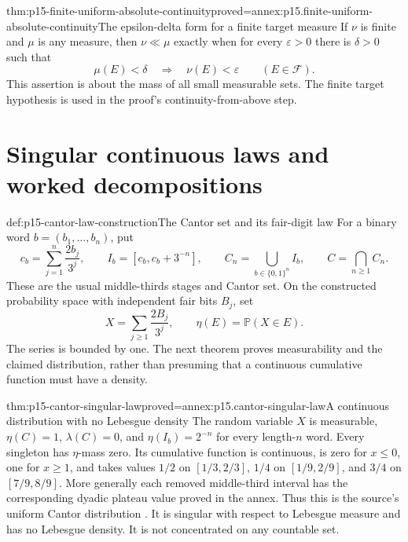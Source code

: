 \begin{hbtheorem}{thm:p15-finite-uniform-absolute-continuity}{proved=annex:p15.finite-uniform-absolute-continuity}{The epsilon-delta form for a finite target measure}
If \(\nu\) is finite and \(\mu\) is any measure, then \(\nu\ll\mu\)
exactly when for every \(\varepsilon>0\) there is \(\delta>0\) such that
\[
                    \mu(E)<\delta\quad\Longrightarrow\quad
                    \nu(E)<\varepsilon\qquad(E\in\mathcal F).
\]
This assertion is about the mass of all small measurable sets. The finite
target hypothesis is used in the proof's continuity-from-above step.
\end{hbtheorem}

\section{Singular continuous laws and worked decompositions}
\label{sec:p15-density-examples}

\begin{hbdefinition}{def:p15-cantor-law-construction}{The Cantor set and its fair-digit law}
For a binary word \(b=(b_1,\ldots,b_n)\), put
\[
 c_b=\sum_{j=1}^n\frac{2b_j}{3^j},\qquad
 I_b=[c_b,c_b+3^{-n}],\qquad
 C_n=\bigcup_{b\in\{0,1\}^n}I_b,\qquad C=\bigcap_{n\geq1}C_n.
\]
These are the usual middle-thirds stages and Cantor set.
On the constructed probability space with independent fair bits \(B_j\), set
\[
                   X=\sum_{j\geq1}\frac{2B_j}{3^j},\qquad
                   \eta(E)=\mathbb P(X\in E).
\]
The series is bounded by one. The next theorem proves measurability
and the claimed distribution, rather than presuming that a continuous
cumulative function must have a density.
\end{hbdefinition}

\begin{hbtheorem}{thm:p15-cantor-singular-law}{proved=annex:p15.cantor-singular-law}{A continuous distribution with no Lebesgue density}
The random variable \(X\) is measurable, \(\eta(C)=1\),
\(\lambda(C)=0\), and \(\eta(I_b)=2^{-n}\) for every length-\(n\) word.
Every singleton has \(\eta\)-mass zero. Its cumulative function is
continuous, is zero for \(x\leq0\), one for \(x\geq1\), and takes values
\(1/2\) on \([1/3,2/3]\), \(1/4\) on \([1/9,2/9]\), and \(3/4\)
on \([7/9,8/9]\). More generally each removed middle-third interval
has the corresponding dyadic plateau value proved in the annex.
Thus this is the source's uniform Cantor distribution
\cite[example~1.2.7, pp.~13--14; exercise~A.4.2, p.~468]{DurrettPTEAuthor2019}.
It is singular with respect to Lebesgue measure and has no Lebesgue density.
It is not concentrated on any countable set.
\end{hbtheorem}

